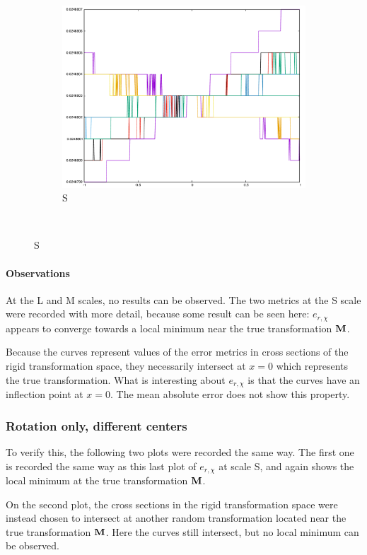 \begin{figure}[H]
\begin{subfigure}{.33\textwidth}
	\includegraphics[width=\linewidth]{fig/ajherr/t3rr/S_mae.pdf}
	\caption{S}
\end{subfigure}\\
\end{figure}


\paragraph{Observations} At the L and M scales, no results can be observed. The two metrics at the S scale were recorded with more detail, because some result can be seen here: $e_{r,\chi}$ appears to converge towards a local minimum near the true transformation $\mathbf{M}$.

Because the curves represent values of the error metrics in cross sections of the rigid transformation space, they necessarily intersect at $x = 0$ which represents the true transformation. What is interesting about $e_{r,\chi}$ is that the curves have an inflection point at $x = 0$. The mean absolute error does not show this property.


\subsubsection{Rotation only, different centers}
To verify this, the following two plots were recorded the same way. The first one is recorded the same way as this last plot of $e_{r,\chi}$ at scale S, and again shows the local minimum at the true transformation $\mathbf{M}$.

On the second plot, the cross sections in the rigid transformation space were instead chosen to intersect at another random transformation located near the true transformation $\mathbf{M}$. Here the curves still intersect, but no local minimum can be observed.

